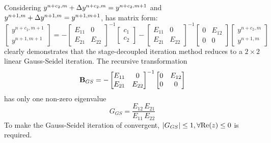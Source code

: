 Considering $y^{n+c_2,m} + {\Delta} y^{n+c_2,m} = y^{n+c_2,m+1}$ and
$y^{n+1,m} + {\Delta} y^{n+1,m} = y^{n+1,m+1}$,
 has matrix form:
\begin{equation}
    \begin{bmatrix}
        y^{n+c_2, m + 1} \\
        y^{n+1, m + 1}
    \end{bmatrix}
    =
    -\begin{bmatrix}
        E_{11} & 0      \\
        E_{21} & E_{22}
    \end{bmatrix}^{-1} \begin{bmatrix}
        c_1 \\c_2
    \end{bmatrix}
    -
    \begin{bmatrix}
        E_{11} & 0      \\
        E_{21} & E_{22}
    \end{bmatrix}^{-1}
    \begin{bmatrix}
        0 & E_{12} \\
        0 & 0
    \end{bmatrix}
    \begin{bmatrix}
        y^{n+c_2, m} \\
        y^{n+1, m}
    \end{bmatrix}
    \label{eq:scalarGSMat}
\end{equation}
 clearly demonstrates that the stage-decoupled
iteration method reduces to a $2\times2$ linear Gauss-Seidel iteration.
The recursive transformation
\begin{equation}
    \mathbf{B}_{GS} = -\begin{bmatrix}
        E_{11} & 0      \\
        E_{21} & E_{22}
    \end{bmatrix}^{-1}
    \begin{bmatrix}
        0 & E_{12} \\
        0 & 0
    \end{bmatrix}
\end{equation}
has only one non-zero eigenvalue
\begin{equation}
    G_{GS} = \frac{E_{12}\,E_{21}}{E_{11}\,E_{22}}
\end{equation}
To make the Gauss-Seidel iteration of 
convergent, $|G_{GS}|\leq 1, \forall \mathrm{Re}(z) \leq 0$ is required.

